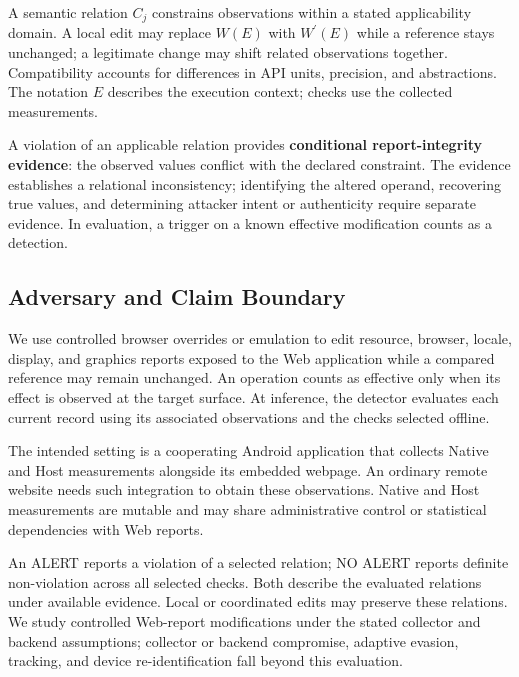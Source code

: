 

A semantic relation \(C_j\) constrains observations within a stated applicability domain. A local edit may replace \(W(E)\) with \(W^{\prime}(E)\) while a reference stays unchanged; a legitimate change may shift related observations together. Compatibility accounts for differences in API units, precision, and abstractions. The notation \(E\) describes the execution context; checks use the collected measurements.

A violation of an applicable relation provides \textbf{conditional report-integrity evidence}: the observed values conflict with the declared constraint. The evidence establishes a relational inconsistency; identifying the altered operand, recovering true values, and determining attacker intent or authenticity require separate evidence. In evaluation, a trigger on a known effective modification counts as a detection.

\hypertarget{sec:2-3}{%
\subsection{Adversary and Claim Boundary}\label{sec:2-3}}

We use controlled browser overrides or emulation to edit resource, browser, locale, display, and graphics reports exposed to the Web application while a compared reference may remain unchanged. An operation counts as effective only when its effect is observed at the target surface. At inference, the detector evaluates each current record using its associated observations and the checks selected offline.

The intended setting is a cooperating Android application that collects Native and Host measurements alongside its embedded webpage. An ordinary remote website needs such integration to obtain these observations. Native and Host measurements are mutable and may share administrative control or statistical dependencies with Web reports.

An ALERT reports a violation of a selected relation; NO ALERT reports definite non-violation across all selected checks. Both describe the evaluated relations under available evidence. Local or coordinated edits may preserve these relations. We study controlled Web-report modifications under the stated collector and backend assumptions; collector or backend compromise, adaptive evasion, tracking, and device re-identification fall beyond this evaluation.
